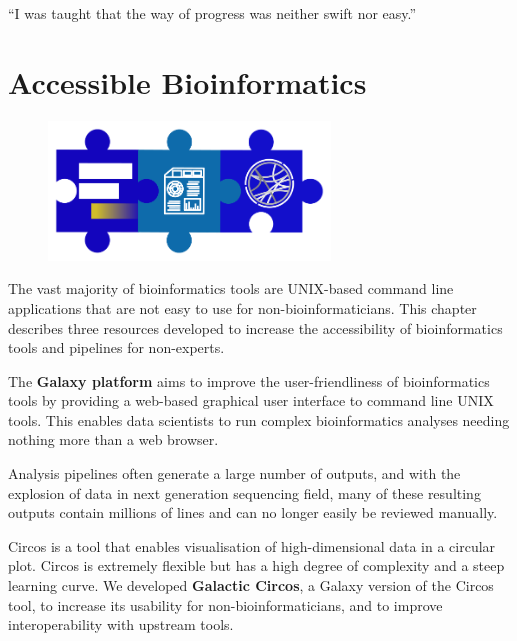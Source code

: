 \cleartorightpage\begin{savequote}[75mm]
``I was taught that the way of progress was neither swift nor easy.''
\end{savequote}

\chapter{Accessible Bioinformatics}\label{chapter:general}
\setcounter{figure}{-1}
\setcounter{table}{-1}
\setcounter{section}{-1}
\setcounter{NAT@ctr}{-1}

\begin{figure}[t!]
\includegraphics[height=10em]{frontmatter/images/chapter-header-technical.png}
\end{figure}
\setcounter{figure}{-1}
\setcounter{table}{-1}
\setcounter{section}{-1}

The vast majority of bioinformatics tools are UNIX-based command line applications that are not easy to use for non-bioinformaticians. This chapter describes three resources developed to increase the accessibility of bioinformatics tools and pipelines for non-experts.

The \textbf{Galaxy platform} aims to improve the user-friendliness of bioinformatics tools by providing a web-based graphical user interface to command line UNIX tools. This enables data scientists to run complex bioinformatics analyses needing nothing more than a web browser.

Analysis pipelines often generate a large number of outputs, and with the explosion of data in next generation sequencing field, many of these resulting outputs contain millions of lines and can no longer easily be reviewed manually.

Circos is a tool that enables visualisation of high-dimensional data in a circular plot. Circos is extremely flexible but has a high degree of complexity and a steep learning curve. We developed \textbf{Galactic Circos}, a Galaxy version of the Circos tool, to increase its usability for non-bioinformaticians, and to improve interoperability with upstream tools.

